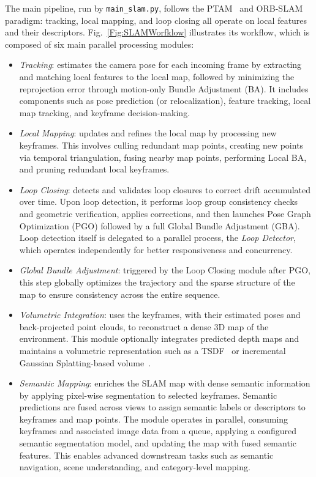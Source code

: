 \documentclass{article}
\begin{document}
The main pipeline, run by \texttt{main\_slam.py}, follows the PTAM~\cite{PTAM} and ORB-SLAM~\cite{ORB_SLAM2} paradigm: tracking, local mapping, and loop closing all operate on local features and their descriptors. Fig.~\ref{Fig:SLAMWorfklow} illustrates its workflow, which is composed of six main parallel processing modules:

\begin{itemize}
\item \textit{Tracking}: estimates the camera pose for each incoming frame by extracting and matching local features to the local map, followed by minimizing the reprojection error through motion-only Bundle Adjustment (BA). It includes components such as pose prediction (or relocalization), feature tracking, local map tracking, and keyframe decision-making.
\item \textit{Local Mapping}: updates and refines the local map by processing new keyframes. This involves culling redundant map points, creating new points via temporal triangulation, fusing nearby map points, performing Local BA, and pruning redundant local keyframes.
\item \textit{Loop Closing}: detects and validates loop closures to correct drift accumulated over time. Upon loop detection, it performs loop group consistency checks and geometric verification, applies corrections, and then launches Pose Graph Optimization (PGO) followed by a full Global Bundle Adjustment (GBA). Loop detection itself is delegated to a parallel process, the \textit{Loop Detector}, which operates independently for better responsiveness and concurrency.
\item \textit{Global Bundle Adjustment}: triggered by the Loop Closing module after PGO, this step globally optimizes the trajectory and the sparse structure of the map to ensure consistency across the entire sequence.
\item \textit{Volumetric Integration}: uses the keyframes, with their estimated poses and back-projected point clouds, to reconstruct a dense 3D map of the environment. This module optionally integrates predicted depth maps and maintains a volumetric representation such as a TSDF~\cite{dong2022ash} or incremental Gaussian Splatting-based volume~\cite{matsuki2023gaussian,kerbl20233d}.
\item \textit{Semantic Mapping}: enriches the SLAM map with dense semantic information by applying pixel-wise segmentation to selected keyframes. Semantic predictions are fused across views to assign semantic labels or descriptors to keyframes and map points. The module operates in parallel, consuming keyframes and associated image data from a queue, applying a configured semantic segmentation model, and updating the map with fused semantic features. This enables advanced downstream tasks such as semantic navigation, scene understanding, and category-level mapping.
\end{itemize}
\end{document}
